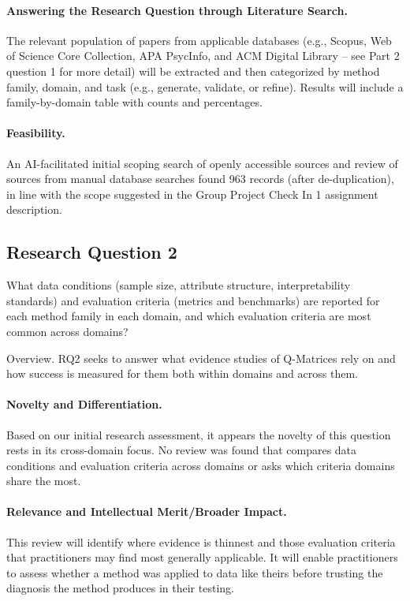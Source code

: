 \documentclass[sigconf,nonacm]{acmart}
\begin{document}
\paragraph{Answering the Research Question through Literature Search.} The relevant population of papers from applicable databases (e.g., Scopus, Web of Science Core Collection, APA PsycInfo, and ACM Digital Library – see Part 2 question 1 for more detail) will be extracted and then categorized by method family, domain, and task (e.g., generate, validate, or refine). Results will include a family-by-domain table with counts and percentages.

\paragraph{Feasibility.} An AI-facilitated initial scoping search of openly accessible sources and review of sources from manual database searches found 963 records (after de-duplication), in line with the scope suggested in the Group Project Check In 1 assignment description.

\subsection{Research Question 2}

What data conditions (sample size, attribute structure, interpretability standards) and evaluation criteria (metrics and benchmarks) are reported for each method family in each domain, and which evaluation criteria are most common across domains?

Overview. RQ2 seeks to answer what evidence studies of Q-Matrices rely on and how success is measured for them both within domains and across them.

\paragraph{Novelty and Differentiation.} Based on our initial research assessment, it appears the novelty of this question rests in its cross-domain focus. No review was found that compares data conditions and evaluation criteria across domains or asks which criteria domains share the most.

\paragraph{Relevance and Intellectual Merit/Broader Impact.} This review will identify where evidence is thinnest and those evaluation criteria that practitioners may find most generally applicable. It will enable practitioners to assess whether a method was applied to data like theirs before trusting the diagnosis the method produces in their testing.
\end{document}

